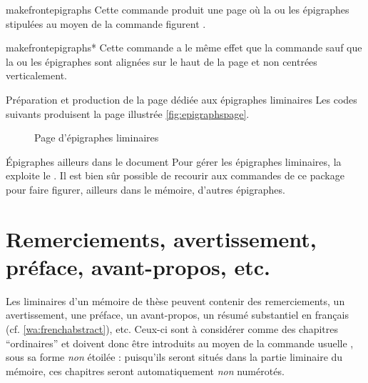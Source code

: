 \begin{docCommand}{makefrontepigraphs}{}
  Cette commande produit une page où la ou les épigraphes stipulées au moyen de
  la commande  figurent .
\end{docCommand}
%
\begin{docCommand}{makefrontepigraphs*}{}
  Cette commande a le même effet que la commande
   sauf que la ou les épigraphes sont alignées sur
  le haut de la page et non centrées verticalement.
\end{docCommand}

\begin{dbexample}{Préparation et production de la page dédiée aux épigraphes
    liminaires}{}
  \NoAutoSpacing%
  Les codes suivants produisent la page illustrée \vref{fig:epigraphspage}.
\end{dbexample}

\begin{figure}[htbp]
  \centering {}
  \caption{Page d'épigraphes liminaires}
  \label{fig:epigraphspage}
\end{figure}

\begin{dbremark}{Épigraphes ailleurs dans le document}{}
  Pour gérer les épigraphes liminaires, la \yatcl{} exploite le
   . Il est bien sûr
  possible de recourir aux commandes de ce package pour faire figurer, ailleurs
  dans le mémoire, d'autres épigraphes.
\end{dbremark}

\section{Remerciements, avertissement, préface, avant-propos, etc.}

Les \glspl{liminaire} d'un mémoire de thèse peuvent contenir des remerciements,
un avertissement, une préface, un avant-propos, un résumé substantiel en
français (cf. \vref{wa:frenchabstract}), etc. Ceux-ci sont à considérer comme
des chapitres \enquote{ordinaires} et doivent donc être introduits au moyen de
la commande usuelle , sous sa forme \emph{non} étoilée :
puisqu'ils seront situés dans la partie liminaire du mémoire, ces chapitres
seront automatiquement \emph{non} numérotés.

